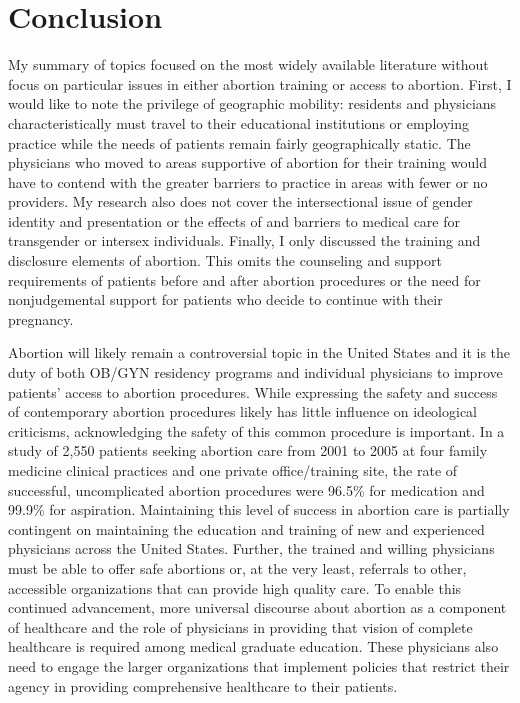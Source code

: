 \documentclass[letterpaper, 12pt]{article}
\begin{document}
\section*{Conclusion}

My summary of topics focused on the most widely available literature without focus on particular issues in either abortion training or access to abortion. First, I would like to note the privilege of geographic mobility: residents and physicians characteristically must travel to their educational institutions or employing practice while the needs of patients remain fairly geographically static. The physicians who moved to areas supportive of abortion for their training would have to contend with the greater barriers to practice in areas with fewer or no providers. My research also does not cover the intersectional issue of gender identity and presentation or the effects of and barriers to medical care for transgender or intersex individuals. Finally, I only discussed the training and disclosure elements of abortion. This omits the counseling and support requirements of patients before and after abortion procedures or the need for nonjudgemental support for patients who decide to continue with their pregnancy.

Abortion will likely remain a controversial topic in the United States and it is the duty of both OB/GYN residency programs and individual physicians to improve patients' access to abortion procedures. While expressing the safety and success of contemporary abortion procedures likely has little influence on ideological criticisms, acknowledging the safety of this common procedure is important.
In a study of 2,550 patients seeking abortion care from 2001 to 2005 at four family medicine clinical practices and one private office/training site, the rate of successful, uncomplicated abortion procedures were 96.5\% for medication and 99.9\% for aspiration. \autocite[pg. 527]{bennett_early_2009}
Maintaining this level of success in abortion care is partially contingent on maintaining the education and training of new and experienced physicians across the United States. Further, the trained and willing physicians must be able to offer safe abortions or, at the very least, referrals to other, accessible organizations that can provide high quality care. To enable this continued advancement, more universal discourse about abortion as a component of healthcare and the role of physicians in providing that vision of complete healthcare is required among medical graduate education. These physicians also need to engage the larger organizations that implement policies that restrict their agency in providing comprehensive healthcare to their patients.

\newpage
\printbibliography
\end{document}
